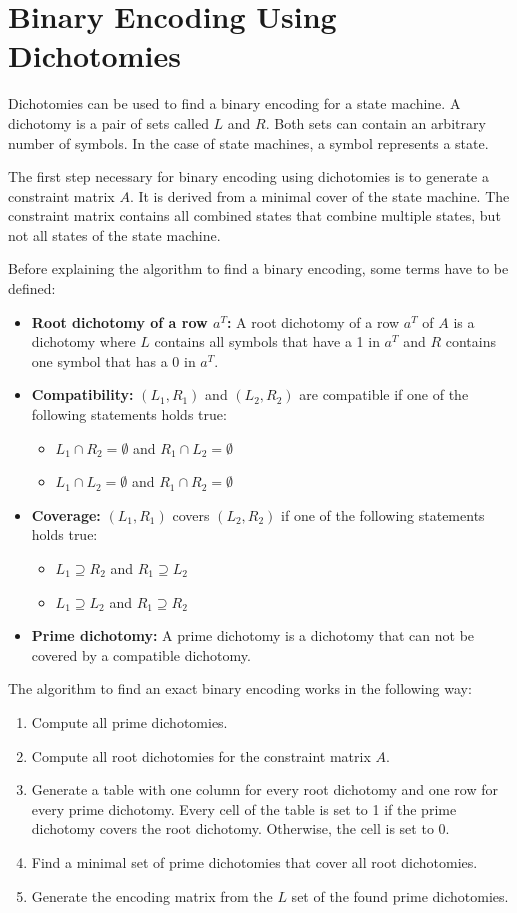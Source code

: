 \chapter{Binary Encoding Using Dichotomies}

Dichotomies can be used to find a binary encoding for a state machine. A dichotomy is a pair of sets called $L$ and $R$. Both sets can contain an arbitrary number of symbols. In the case of state machines, a symbol represents a state.

The first step necessary for binary encoding using dichotomies is to generate a constraint matrix $A$. It is derived from a minimal cover of the state machine. The constraint matrix contains all combined states that combine multiple states, but not all states of the state machine.

Before explaining the algorithm to find a binary encoding, some terms have to be defined:
\begin{itemize}
\item \textbf{Root dichotomy of a row $a^T$:} A root dichotomy of a row $a^T$ of $A$ is a dichotomy where $L$ contains all symbols that have a 1 in $a^T$ and $R$ contains one symbol that has a 0 in $a^T$.
\item \textbf{Compatibility:} $(L_1,R_1)$ and $(L_2,R_2)$ are compatible if one of the following statements holds true:
\begin{itemize}
\item $L_1 \cap R_2 = \emptyset$ and $R_1 \cap L_2 = \emptyset$
\item $L_1 \cap L_2 = \emptyset$ and $R_1 \cap R_2 = \emptyset$
\end{itemize}
\item \textbf{Coverage:} $(L_1,R_1)$ covers $(L_2,R_2)$ if one of the following statements holds true:
\begin{itemize}
\item $L_1 \supseteq R_2$ and $R_1 \supseteq L_2$
\item $L_1 \supseteq L_2$ and $R_1 \supseteq R_2$
\end{itemize}
\item \textbf{Prime dichotomy:} A prime dichotomy is a dichotomy that can not be covered by a compatible dichotomy.
\end{itemize}

The algorithm to find an exact binary encoding works in the following way:
\begin{enumerate}
\item Compute all prime dichotomies.
\item Compute all root dichotomies for the constraint matrix $A$.
\item Generate a table with one column for every root dichotomy and one row for every prime dichotomy. Every cell of the table is set to 1 if the prime dichotomy covers the root dichotomy. Otherwise, the cell is set to 0.
\item Find a minimal set of prime dichotomies that cover all root dichotomies.
\item Generate the encoding matrix from the $L$ set of the found prime dichotomies.
\end{enumerate}

